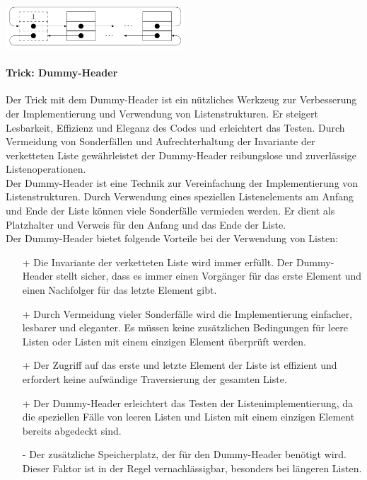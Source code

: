 \newpage
    
\begin{center}
    \centering
    \includegraphics[width=0.5\textwidth]{folgen-felder-listen/abb_2.png}
    \label{fig:abb_2}
\end{center}

\paragraph{Trick: Dummy-Header}
Der Trick mit dem Dummy-Header ist ein nützliches Werkzeug zur Verbesserung der Implementierung und Verwendung von Listenstrukturen. Er steigert Lesbarkeit, Effizienz und Eleganz des Codes und erleichtert das Testen. Durch Vermeidung von Sonderfällen und Aufrechterhaltung der Invariante der verketteten Liste gewährleistet der Dummy-Header reibungslose und zuverlässige Listenoperationen.\\
Der Dummy-Header ist eine Technik zur Vereinfachung der Implementierung von Listenstrukturen. Durch Verwendung eines speziellen Listenelements am Anfang und Ende der Liste können viele Sonderfälle vermieden werden. Er dient als Platzhalter und Verweis für den Anfang und das Ende der Liste.\\
Der Dummy-Header bietet folgende Vorteile bei der Verwendung von Listen:

\begin{itemize}
    \item [+]Die Invariante der verketteten Liste wird immer erfüllt. Der Dummy-Header stellt sicher, dass es immer einen Vorgänger für das erste Element und einen Nachfolger für das letzte Element gibt.
    
    \item [+]Durch Vermeidung vieler Sonderfälle wird die Implementierung einfacher, lesbarer und eleganter. Es müssen keine zusätzlichen Bedingungen für leere Listen oder Listen mit einem einzigen Element überprüft werden.
    
    \item [+]Der Zugriff auf das erste und letzte Element der Liste ist effizient und erfordert keine aufwändige Traversierung der gesamten Liste.
    
    \item [+]Der Dummy-Header erleichtert das Testen der Listenimplementierung, da die speziellen Fälle von leeren Listen und Listen mit einem einzigen Element bereits abgedeckt sind.
    \item [-]Der zusätzliche Speicherplatz, der für den Dummy-Header benötigt wird. Dieser Faktor ist in der Regel vernachlässigbar, besonders bei längeren Listen.

\end{itemize}


